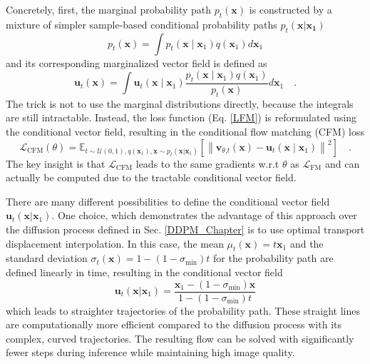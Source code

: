 Concretely, first, the marginal probability path $p_t(\mathbf{x})$ is constructed by a mixture of simpler sample-based conditional probability paths $p_t(\mathbf{x} |\mathbf{x_1}) $
\begin{equation}
	p_t(\mathbf{x}) = \int p_t(\mathbf{x} \mid \mathbf{x}_1) q(\mathbf{x}_1) d\mathbf{x}_1
\end{equation}
and its corresponding marginalized vector field is defined as 
\begin{equation}
	\mathbf{u}_t(\mathbf{x}) = \int \mathbf{u}_t(\mathbf{x} \mid \mathbf{x}_1) \frac{p_t(\mathbf{x} \mid \mathbf{x}_1) q(\mathbf{x}_1)}{p_t(\mathbf{x})} d\mathbf{x}_1 \quad.
\end{equation}
The trick is not to use the marginal distributions directly, because the integrals are still intractable. Instead, the loss function (Eq. \ref{LFM}) is reformulated using the conditional vector field, resulting in the conditional flow matching (CFM) loss
\begin{equation}
	\mathcal{L}_{\text{CFM}}(\theta) = \mathbb{E}_{t \sim \mathcal{U}(0,1), q(\mathbf{x}_1), \mathbf{x} \sim p_t(\mathbf{x}|\mathbf{x}_1)} \left[ \left\| \mathbf{v}_{\theta \text{,} t}(\mathbf{x}) - \mathbf{u}_t(\mathbf{x} \mid \mathbf{x}_1) \right\|^2 \right]  \quad.
	\label{LCFM}
\end{equation}
The key insight is that $\mathcal{L}_{\text{CFM}}$ leads to the same gradients w.r.t $\theta$ as $\mathcal{L}_{\text{FM}}$ and can actually be computed due to the tractable conditional vector field. 

There are many different possibilities to define the conditional vector field  $\mathbf{u}_t(\mathbf{x}|\mathbf{x}_1).$ One choice, which demonstrates the advantage of this approach over the diffusion process defined in Sec. \ref{DDPM_Chapter} is to use optimal transport displacement interpolation. In this case, the mean $\mu_t(\mathbf{x}) = t \mathbf{x}_1$ and the standard deviation $\sigma_t(\mathbf{x}) = 1 - (1-\sigma_{\text{min}})t$ for the probability path are defined linearly in time, resulting in the conditional vector field
\begin{equation}
	\mathbf{u}_t(\mathbf{x}|\mathbf{x}_1) = \frac{\mathbf{x}_1 - (1- \sigma_{\text{min}})\mathbf{x}}{1-(1-\sigma_{\text{min}})t}
\end{equation}
which leads to straighter trajectories of the probability path. These straight lines are computationally more efficient compared to the diffusion process with its complex, curved trajectories. The resulting flow can be solved with significantly fewer steps during inference while maintaining high image quality.





